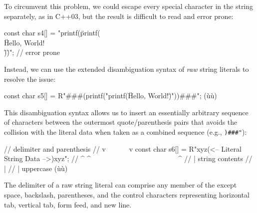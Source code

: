 \noindent To circumvent this problem, we could escape every special character in
the string separately, as in C++03, but the result is difficult to read
and error prone:

\begin{emcppslisting}
const char s4[] = "printf(\"printf(\\\"Hello, World!\\\")\")";  // error prone
\end{emcppslisting}

\noindent Instead, we can use the extended disambiguation syntax of \emph{raw}
string literals to resolve the issue:

\begin{emcppslisting}
const char s5[] = R"###(printf("printf(\"Hello, World!\")"))###";  (ù{}ù)
\end{emcppslisting}


\noindent This disambiguation syntax allows us to insert an essentially
arbitrary sequence of
characters between the outermost quote/parenthesis pairs that avoids the
collision with the literal data when taken as a combined sequence (e.g.,
\lstinline!)###"!):

\begin{emcppslisting}
//                       delimiter and parenthesis
//                  v~~~                           ~~~v
const char s6[] = R"xyz(<-- Literal String Data -->)xyz";
//                ^     ^~~~~~~~~~~~~~~~~~~~~~~~~~^
//                |          string contents
//                |
//                | uppercase (ù{}ù)
\end{emcppslisting}

\noindent The delimiter of a raw string literal can
comprise any member of the  except
space, backslash, parentheses, and the control characters representing
  horizontal tab, vertical tab, form feed, and new line.

